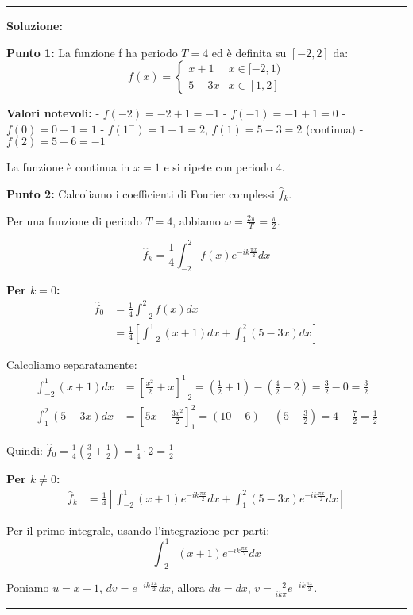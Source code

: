 \documentclass[12pt, a4paper]{article}
\newenvironment{solution}
{\par\noindent\rule{\textwidth}{0.4pt}\par\textbf{Soluzione:}\medskip\par}
{\par\rule{\textwidth}{0.4pt}\par\bigskip}
\begin{document}
\begin{solution}
\textbf{Punto 1:} La funzione f ha periodo $T = 4$ ed è definita su $[-2, 2]$ da:
\[
f(x) = \begin{cases} 
x+1 & x \in [-2,1) \\
5-3x & x \in [1,2]
\end{cases}
\]

\textbf{Valori notevoli:}
- $f(-2) = -2+1 = -1$
- $f(-1) = -1+1 = 0$  
- $f(0) = 0+1 = 1$
- $f(1^-) = 1+1 = 2$, $f(1) = 5-3 = 2$ (continua)
- $f(2) = 5-6 = -1$

La funzione è continua in $x = 1$ e si ripete con periodo 4.

\textbf{Punto 2:} Calcoliamo i coefficienti di Fourier complessi $\hat{f}_k$.

Per una funzione di periodo $T = 4$, abbiamo $\omega = \frac{2\pi}{T} = \frac{\pi}{2}$.

\[
\hat{f}_k = \frac{1}{4} \int_{-2}^{2} f(x) e^{-ik\frac{\pi x}{2}} dx
\]

\textbf{Per $k = 0$:}
\begin{align}
\hat{f}_0 &= \frac{1}{4} \int_{-2}^{2} f(x) dx \\
&= \frac{1}{4} \left[ \int_{-2}^{1} (x+1) dx + \int_{1}^{2} (5-3x) dx \right]
\end{align}

Calcoliamo separatamente:
\begin{align}
\int_{-2}^{1} (x+1) dx &= \left[\frac{x^2}{2} + x\right]_{-2}^{1} = \left(\frac{1}{2} + 1\right) - \left(\frac{4}{2} - 2\right) = \frac{3}{2} - 0 = \frac{3}{2} \\
\int_{1}^{2} (5-3x) dx &= \left[5x - \frac{3x^2}{2}\right]_{1}^{2} = \left(10 - 6\right) - \left(5 - \frac{3}{2}\right) = 4 - \frac{7}{2} = \frac{1}{2}
\end{align}

Quindi: $\hat{f}_0 = \frac{1}{4} \left(\frac{3}{2} + \frac{1}{2}\right) = \frac{1}{4} \cdot 2 = \frac{1}{2}$

\textbf{Per $k \neq 0$:}
\begin{align}
\hat{f}_k &= \frac{1}{4} \left[ \int_{-2}^{1} (x+1) e^{-ik\frac{\pi x}{2}} dx + \int_{1}^{2} (5-3x) e^{-ik\frac{\pi x}{2}} dx \right]
\end{align}

Per il primo integrale, usando l'integrazione per parti:
\[
\int_{-2}^{1} (x+1) e^{-ik\frac{\pi x}{2}} dx
\]

Poniamo $u = x+1$, $dv = e^{-ik\frac{\pi x}{2}} dx$, allora $du = dx$, $v = \frac{-2}{ik\pi} e^{-ik\frac{\pi x}{2}}$.


\end{solution}
\end{document}
